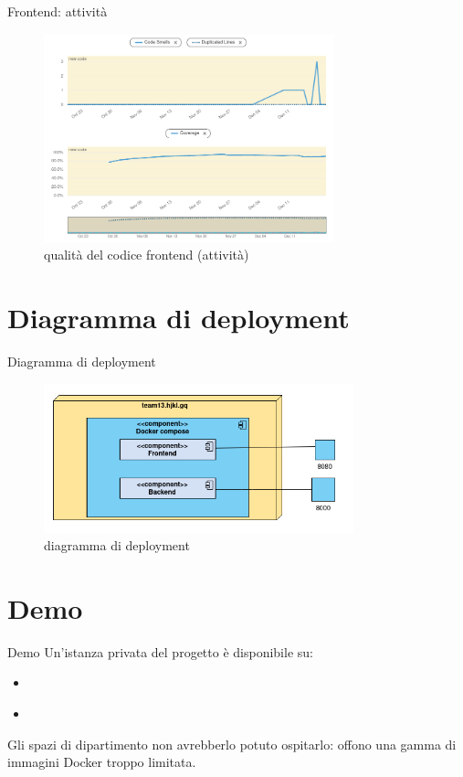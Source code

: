 \documentclass{beamer}
\begin{document}
\begin{frame}{Frontend: attività}
	\begin{figure}
		\includegraphics[width=0.75\textwidth]{quality-frontend-activity}
		\caption{qualità del codice frontend (attività)}
	\end{figure}
\end{frame}

\section{Diagramma di deployment}
\begin{frame}{Diagramma di deployment}
	\begin{figure}
		\includegraphics[width=0.8\textwidth]{deployment}
		\caption{diagramma di deployment}
	\end{figure}
\end{frame}

\section{Demo}
\begin{frame}{Demo}
	Un'istanza privata del progetto è disponibile su:
	\begin{itemize}
		\item \hyperlink{team13.hjkl.gq:8000/swagger/index.html}{}
		\item \hyperlink{team13.hjkl.gq}{}
	\end{itemize}
	Gli spazi di dipartimento non avrebberlo potuto ospitarlo: offono una gamma di
	immagini Docker troppo limitata.
\end{frame}
\end{document}
